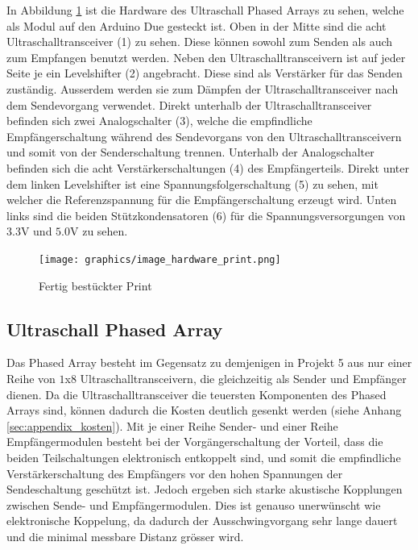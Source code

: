 In Abbildung \ref{fig:image_hardware_print} ist die Hardware des Ultraschall Phased Arrays zu sehen, welche als Modul auf den Arduino Due gesteckt ist. Oben in der Mitte sind die acht Ultraschalltransceiver (1) zu sehen. Diese können sowohl zum Senden als auch zum Empfangen benutzt werden. Neben den Ultraschalltransceivern ist auf jeder Seite je ein Levelshifter (2) angebracht. Diese sind als Verstärker für das Senden zuständig. Ausserdem werden sie zum Dämpfen der Ultraschalltransceiver nach dem Sendevorgang verwendet. Direkt unterhalb der Ultraschalltransceiver befinden sich zwei Analogschalter (3), welche die empfindliche Empfängerschaltung während des Sendevorgans von den Ultraschalltransceivern und somit von der Senderschaltung trennen. Unterhalb der Analogschalter befinden sich die acht Verstärkerschaltungen (4) des Empfängerteils. Direkt unter dem linken Levelshifter ist eine Spannungsfolgerschaltung (5) zu sehen, mit welcher die Referenzspannung für die Empfängerschaltung erzeugt wird. Unten links sind die beiden Stützkondensatoren (6) für die Spannungsversorgungen von $3.3 \mathrm{V}$ und $5.0 \mathrm{V}$ zu sehen.

\begin{figure}[htb]
\begin{center}
\texttt{[image: graphics/image\_hardware\_print.png]}
\end{center}
\caption{Fertig bestückter Print} %
\label{fig:image_hardware_print}
\end{figure}
%


\subsection{Ultraschall Phased Array}\label{sec:ultraschall_phased-array}
Das Phased Array besteht im Gegensatz zu demjenigen in Projekt 5 aus nur einer Reihe von $1$x$8$ Ultraschalltransceivern, die gleichzeitig als Sender und Empfänger dienen. Da die Ultraschalltransceiver die teuersten Komponenten des Phased Arrays sind, können dadurch die Kosten deutlich gesenkt werden (siehe Anhang \ref{sec:appendix_kosten}). Mit je einer Reihe Sender- und einer Reihe Empfängermodulen besteht bei der Vorgängerschaltung der Vorteil, dass die beiden Teilschaltungen elektronisch entkoppelt sind, und somit die empfindliche Verstärkerschaltung des Empfängers vor den hohen Spannungen der Sendeschaltung geschützt ist. Jedoch ergeben sich starke akustische Kopplungen zwischen Sende- und Empfängermodulen. Dies ist genauso unerwünscht wie elektronische Koppelung, da dadurch der Ausschwingvorgang sehr lange dauert und die minimal messbare Distanz grösser wird.


